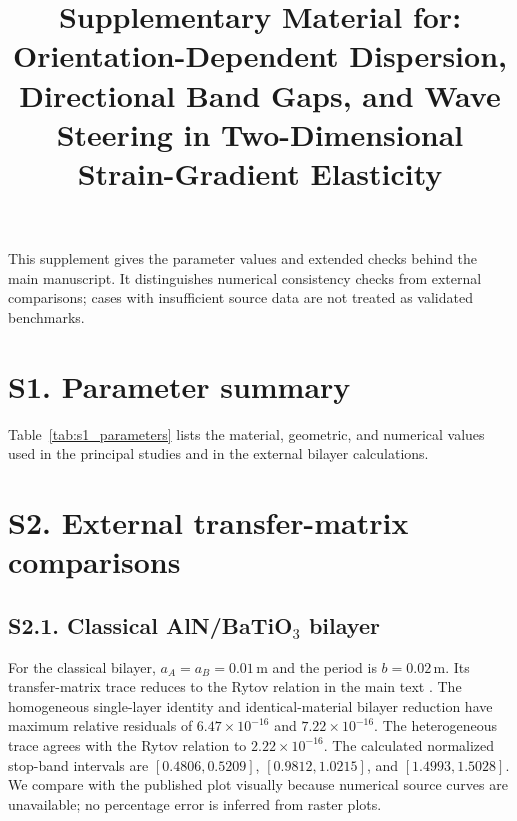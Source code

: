 \documentclass[preprint,12pt]{elsarticle}
\begin{document}
\begin{frontmatter}
\title{Supplementary Material for: Orientation-Dependent Dispersion, Directional Band Gaps, and Wave Steering in Two-Dimensional Strain-Gradient Elasticity}
\end{frontmatter}

This supplement gives the parameter values and extended checks behind the main manuscript. It distinguishes numerical consistency checks from external comparisons; cases with insufficient source data are not treated as validated benchmarks.

\section*{S1. Parameter summary}
Table~\ref{tab:s1_parameters} lists the material, geometric, and numerical values used in the principal studies and in the external bilayer calculations.


\section*{S2. External transfer-matrix comparisons}
\subsection*{S2.1. Classical AlN/BaTiO$_3$ bilayer}
For the classical bilayer, $a_A=a_B=0.01\,\mathrm{m}$ and the period is $b=0.02\,\mathrm{m}$. Its transfer-matrix trace reduces to the Rytov relation in the main text \cite{li2024anchorB,zhengwei2009}. The homogeneous single-layer identity and identical-material bilayer reduction have maximum relative residuals of $6.47\times10^{-16}$ and $7.22\times10^{-16}$. The heterogeneous trace agrees with the Rytov relation to $2.22\times10^{-16}$. The calculated normalized stop-band intervals are $[0.4806,0.5209]$, $[0.9812,1.0215]$, and $[1.4993,1.5028]$. We compare with the published plot visually because numerical source curves are unavailable; no percentage error is inferred from raster plots.
\end{document}
